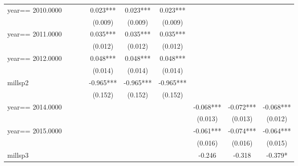 \begin{table}[htbp]
\begin{tabular}{l*{9}{c}}
year==  2010.0000   &               &               &               &       0.023***&       0.023***&       0.023***&               &               &               \\
                    &               &               &               &     (0.009)   &     (0.009)   &     (0.009)   &               &               &               \\
year==  2011.0000   &               &               &               &       0.035***&       0.035***&       0.035***&               &               &               \\
                    &               &               &               &     (0.012)   &     (0.012)   &     (0.012)   &               &               &               \\
year==  2012.0000   &               &               &               &       0.048***&       0.048***&       0.048***&               &               &               \\
                    &               &               &               &     (0.014)   &     (0.014)   &     (0.014)   &               &               &               \\
millsp2             &               &               &               &      -0.965***&      -0.965***&      -0.965***&               &               &               \\
                    &               &               &               &     (0.152)   &     (0.152)   &     (0.152)   &               &               &               \\
year==  2014.0000   &               &               &               &               &               &               &      -0.068***&      -0.072***&      -0.068***\\
                    &               &               &               &               &               &               &     (0.013)   &     (0.013)   &     (0.012)   \\
year==  2015.0000   &               &               &               &               &               &               &      -0.061***&      -0.074***&      -0.064***\\
                    &               &               &               &               &               &               &     (0.016)   &     (0.016)   &     (0.015)   \\
millsp3             &               &               &               &               &               &               &      -0.246   &      -0.318   &      -0.379*  \\

\end{tabular}
\end{table}
